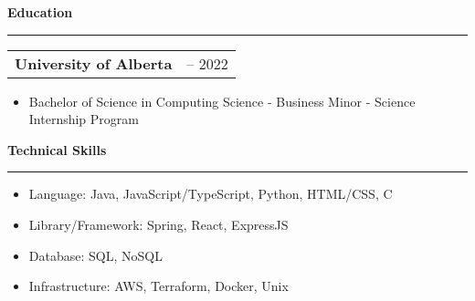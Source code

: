 \documentclass[11pt]{article}
\newenvironment{compactList}
{
  \begin{itemize}
    \setlength{\itemsep}{0pt}
    \setlength{\parskip}{0pt}
}
{\end{itemize}}
\begin{document}
\begin{center}
  \textbf{Education}
  \noindent\rule[10pt]{0.9\paperwidth}{0.4pt}
\end{center}
\vspace{-20pt}
\begin{tabularx}{\textwidth}
  {
    >{\raggedright\arraybackslash}X
    >{\raggedleft\arraybackslash}X
  }
  \textbf{University of Alberta} & 2017 – 2022 \\
\end{tabularx}
\vspace{-20pt}
\begin{itemize}
  \item Bachelor of Science in Computing Science - Business Minor - Science Internship Program
\end{itemize}
\vspace{-15pt}

\begin{center}
  \textbf{Technical Skills}
  \noindent\rule[10pt]{0.9\paperwidth}{0.4pt}
\end{center}
\vspace{-30pt}
\begin{compactList}
  \item Language: Java, JavaScript/TypeScript, Python, HTML/CSS, C
  \item Library/Framework: Spring, React, ExpressJS
  \item Database: SQL, NoSQL
  \item Infrastructure: AWS, Terraform, Docker, Unix
\end{compactList}
\vspace{-15pt}
\end{document}
